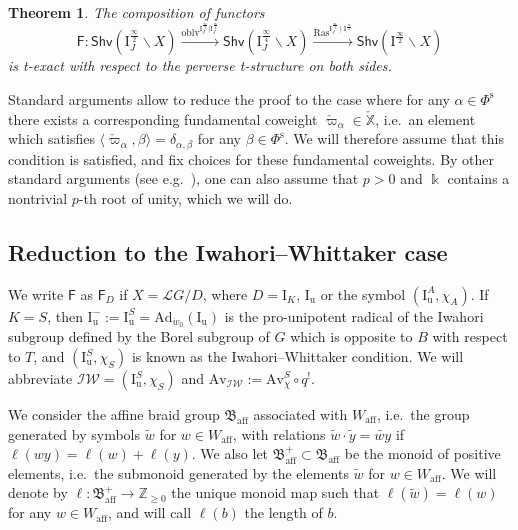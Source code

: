 \documentclass[11pt]{amsart}
\numberwithin{equation}{section}
\theoremstyle{plain}
\newtheorem{thm}{Theorem}[section]
\theoremstyle{definition}
\newcommand{\I}{{\mathrm I}}
\renewcommand{\k}{\Bbbk}
\newcommand{\sL}{{\mathcal L}}
\newcommand{\X}{{\mathbb X}}
\newcommand{\Xd}{\check{\X}}
\newcommand{\Z}{{\mathbb Z}}
\newcommand{\Ad}{\mathrm{Ad}}
\newcommand{\semi}{{{\frac{\infty}{2}}}}
\newcommand{\quar}{{{\frac{\infty}{4}}}}
\newcommand{\oblv}{\mathrm{oblv}}
\newcommand{\Av}{\mathrm{Av}}
\newcommand{\IW}{\mathcal{IW}}
\newcommand{\Phis}{\Phi^{\mathrm{s}}}
\newcommand{\af}{\mathrm{aff}}
\newcommand{\Shv}{\mathsf{Shv}}
\newcommand{\Iu}{\mathrm{I}_{\mathrm{u}}}
\begin{document}
\begin{thm}
\label{thm:texactness}
The composition of functors 
\[
\mathsf{F}:
\Shv\left(\I_J^{\semi}\backslash X\right) \xrightarrow{\oblv^{\I_J^{\semi}|\I_J^{\quar}}} \Shv\left(\I_J^{\quar}\backslash X\right) 
\xrightarrow{\mathrm{Ras}^{\I_J^{\quar}\mid \I^\semi}} \Shv\left(\I^{\semi}\backslash X\right)
\] 
is t-exact with respect to the perverse t-structure on both sides. 
\end{thm}

Standard arguments allow to reduce the proof to the case where for any $\alpha\in \Phis$ there exists a corresponding fundamental coweight 
$\check{\varpi}_{\alpha}\in \Xd$, i.e.~an element which satisfies $\langle \check{\varpi}_{\alpha}, \beta \rangle =\delta_{\alpha,\beta}$ for any $\beta\in \Phis$. We will therefore assume that this condition is satisfied, and fix choices for these fundamental coweights. 
By other standard arguments (see e.g.~\cite[\S 6]{bbdg}), one can also assume that $p>0$ and $\k$ contains a nontrivial $p$-th root of unity, which we will do.

\subsection{Reduction to the Iwahori--Whittaker case} 
\label{subsect:redtn-IW}

We write $\mathsf{F}$ as $\mathsf{F}_{D}$ if $X=\sL{G}/D$, where $D=\I_K$, $\Iu$ or the symbol $(\Iu^A,\chi_A)$. 
If $K=S$, then $\Iu^-:=\Iu^S=\Ad_{\dot{w}_0}(\Iu)$ is the pro-unipotent radical of the Iwahori subgroup defined by the Borel subgroup of $G$ which is opposite to $B$ with respect to $T$, and $(\Iu^S,\chi_S)$ is known as the Iwahori--Whittaker condition. 
We will abbreviate $\IW=(\Iu^S,\chi_S)$ and $\Av_{\IW}:=\Av^S_{\chi} \circ q^!$. 

We consider the affine braid group $\mathfrak{B}_\af$ associated with $W_\af$, i.e.~the group generated by symbols $\widetilde{w}$ for $w \in W_\af$, with relations $\widetilde{w} \cdot \widetilde{y} = \widetilde{wy}$ if $\ell(wy)=\ell(w)+\ell(y)$.
We also let $\mathfrak{B}^+_\af \subset \mathfrak{B}_\af$ be the monoid of positive elements, i.e.~the submonoid generated by the elements $\widetilde{w}$ for $w \in W_\af$.
We will denote by $\ell : \mathfrak{B}^+_\af \to \Z_{\geq 0}$ the unique monoid map such that $\ell(\widetilde{w})=\ell(w)$ for any $w \in W_\af$, and will call $\ell(b)$ the length of $b$.
\end{document}
